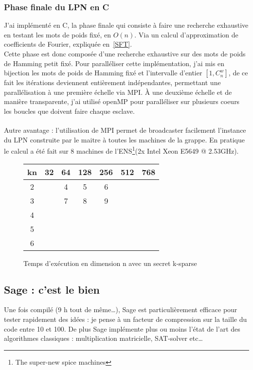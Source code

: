\documentclass{article}		%
\theoremstyle{definition}
\theoremstyle{plain}
\theoremstyle{plain}
\theoremstyle{plain}
\theoremstyle{plain}
\theoremstyle{plain}
\begin{document}
\subsubsection{Phase finale du LPN en C}
J'ai implémenté en C, la phase finale qui consiste à faire une recherche
exhaustive en testant les mots de poids fixé, en $O(n)$. Via un calcul
d'approximation de coefficients de Fourier, expliquée en~\ref{SFT}.
\\
Cette phase est donc composée d'une recherche exhaustive sur des mots de
poids de Hamming petit fixé. Pour paralléliser cette implémentation, j'ai
mis en bijection les mots de poids de Hamming fixé et l'intervalle
d'entier $[1, C_{n}^{w}]$, de ce fait les itérations deviennent
entièrement indépendantes, permettant une parallélisation à une première
échelle via MPI.
À une deuxième échelle et de manière transparente, j'ai utilisé openMP
pour paralléliser sur plusieurs coeurs les boucles que doivent faire
chaque esclave. 
\\\\
Autre avantage : l'utilisation de MPI permet de broadcaster facilement
l'instance du LPN construite par le maitre à toutes les machines de la
grappe. En pratique le calcul a été fait sur 8 machines de
l'ENS\footnote{The super-new spice machines}(2x Intel Xeon E5649 @
2.53GHz).  
\begin{figure}
\caption{Temps d'exécution en dimension n avec un secret k-sparse}
\begin{center}
\begin{tabular}{|c |c | c | c | c |c|c| }
\hline
   kn & 32 & 64 & 128 & 256 & 512 & 768 \\
\hline
 2  & &4 & 5 & 6 & &\\
\hline
  3 & &7 & 8 & 9 & &\\
\hline
 4 & & & & & & \\
 \hline
5 & & & & & & \\
 \hline
6 & & & & & & \\
\hline 
\end{tabular}
\end{center}
\end{figure}


\subsection{Sage : c'est le bien}
 Une fois compilé (9 h tout de même\dots), Sage est particulièrement efficace
pour tester rapidement des idées : je pense à un facteur de compression
sur la taille du code
entre 10 et 100. De plus Sage
implémente plus ou moins l'état de l'art des algorithmes classiques : multiplication
matricielle, SAT-solver etc\dots  
\end{document}
